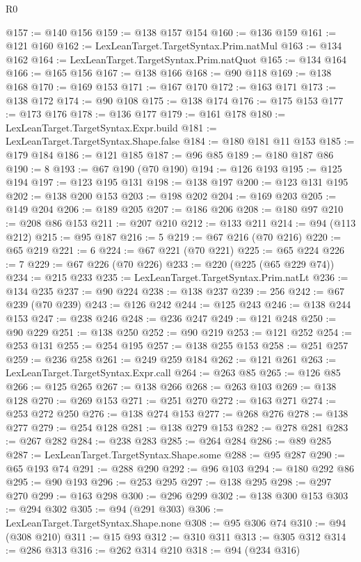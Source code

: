 \begin{lexlean}{R0}
\begin{coremodule}
@157 := @140 @156
@159 := @138 @157 @154
@160 := @136 @159
@161 := @121 @160
@162 := LexLeanTarget.TargetSyntax.Prim.natMul
@163 := @134 @162
@164 := LexLeanTarget.TargetSyntax.Prim.natQuot
@165 := @134 @164
@166 := @165 @156
@167 := @138 @166
@168 := @90 @118
@169 := @138 @168
@170 := @169 @153
@171 := @167 @170
@172 := @163 @171
@173 := @138 @172
@174 := @90 @108
@175 := @138 @174
@176 := @175 @153
@177 := @173 @176
@178 := @136 @177
@179 := @161 @178
@180 := LexLeanTarget.TargetSyntax.Expr.build
@181 := LexLeanTarget.TargetSyntax.Shape.false
@184 := @180 @181 @11 @153
@185 := @179 @184
@186 := @121 @185
@187 := @96 @85
@189 := @180 @187 @86
@190 := 8
@193 := @67 @190 (@70 @190)
@194 := @126 @193
@195 := @125 @194
@197 := @123 @195 @131
@198 := @138 @197
@200 := @123 @131 @195
@202 := @138 @200 @153
@203 := @198 @202
@204 := @169 @203
@205 := @149 @204
@206 := @189 @205
@207 := @186 @206
@208 := @180 @97
@210 := @208 @86 @153
@211 := @207 @210
@212 := @133 @211
@214 := @94 (@113 @212)
@215 := @95 @187
@216 := 5
@219 := @67 @216 (@70 @216)
@220 := @65 @219
@221 := 6
@224 := @67 @221 (@70 @221)
@225 := @65 @224
@226 := 7
@229 := @67 @226 (@70 @226)
@233 := @220 (@225 (@65 @229 @74))
@234 := @215 @233
@235 := LexLeanTarget.TargetSyntax.Prim.natLt
@236 := @134 @235
@237 := @90 @224
@238 := @138 @237
@239 := 256
@242 := @67 @239 (@70 @239)
@243 := @126 @242
@244 := @125 @243
@246 := @138 @244 @153
@247 := @238 @246
@248 := @236 @247
@249 := @121 @248
@250 := @90 @229
@251 := @138 @250
@252 := @90 @219
@253 := @121 @252
@254 := @253 @131
@255 := @254 @195
@257 := @138 @255 @153
@258 := @251 @257
@259 := @236 @258
@261 := @249 @259 @184
@262 := @121 @261
@263 := LexLeanTarget.TargetSyntax.Expr.call
@264 := @263 @85
@265 := @126 @85
@266 := @125 @265
@267 := @138 @266
@268 := @263 @103
@269 := @138 @128
@270 := @269 @153
@271 := @251 @270
@272 := @163 @271
@274 := @253 @272 @250
@276 := @138 @274 @153
@277 := @268 @276
@278 := @138 @277
@279 := @254 @128
@281 := @138 @279 @153
@282 := @278 @281
@283 := @267 @282
@284 := @238 @283
@285 := @264 @284
@286 := @89 @285
@287 := LexLeanTarget.TargetSyntax.Shape.some
@288 := @95 @287
@290 := @65 @193 @74
@291 := @288 @290
@292 := @96 @103
@294 := @180 @292 @86
@295 := @90 @193
@296 := @253 @295
@297 := @138 @295
@298 := @297 @270
@299 := @163 @298
@300 := @296 @299
@302 := @138 @300 @153
@303 := @294 @302
@305 := @94 (@291 @303)
@306 := LexLeanTarget.TargetSyntax.Shape.none
@308 := @95 @306 @74
@310 := @94 (@308 @210)
@311 := @15 @93
@312 := @310 @311
@313 := @305 @312
@314 := @286 @313
@316 := @262 @314 @210
@318 := @94 (@234 @316)

\end{coremodule}
\end{lexlean}
